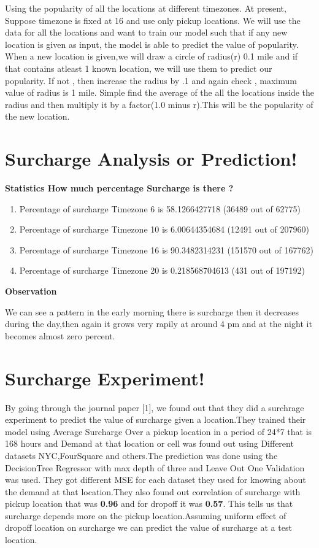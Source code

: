 \documentclass{article}
\begin{document}
Using the popularity of all the locations at different timezones.
At present, Suppose timezone is fixed at 16 and use only pickup locations.
We will use the data for all the locations and want to train our model such that if any new location is given as input, the model is able to predict the value of popularity.
\\
When a new location is given,we will draw a circle of radius(r) 0.1 mile and if that contains atleast 1 known location, we will use them to predict our popularity.
If not , then increase the radius by .1 and  again check , maximum  value of radius is 1 mile.
Simple find the average of the all the locations inside the radius and then multiply it by a factor(1.0 minus r).This will be the popularity of the new location.
  
\section{Surcharge Analysis or Prediction!}


\textbf{Statistics How much percentage Surcharge is there ?}
\begin{enumerate}
\item Percentage of surcharge Timezone 6  is 58.1266427718 (36489 out of 62775)
\item Percentage of surcharge Timezone 10 is 6.00644354684 (12491 out of 207960)
\item Percentage of surcharge Timezone 16 is 90.3482314231 (151570 out of 167762)
\item Percentage of surcharge Timezone 20 is 0.218568704613 (431 out of 197192)
\end{enumerate}

\textbf{Observation}

We can see a pattern in the early morning there is surcharge then it decreases during the day,then again it grows very rapily at around 4 pm and at the night it becomes almost zero percent.

\section{Surcharge Experiment!}


By going through the journal paper [1], we found out that they did a surchrage experiment to predict the value of surcharge given a location.They trained their model using Average Surcharge Over a pickup location in a period of 24*7 that is 168  hours and Demand at that location or cell was found out using Different datasets NYC,FourSquare and others.The prediction was done using the DecisionTree Regressor with max depth of three and Leave Out One Validation was used. They got different MSE for each dataset they used for knowing about the demand at that location.They also found out correlation of surcharge with pickup location that was \textbf{0.96} and for dropoff it was \textbf{0.57}. This tells us that surcharge depends more on the pickup location.Assuming uniform effect of dropoff location on surcharge we can predict the value of surcharge at a test location.
\end{document}
